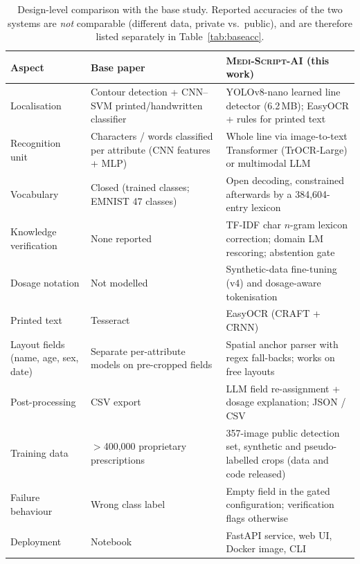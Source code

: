 \documentclass[journal]{IEEEtran}
\newcommand{\sys}{\textsc{Medi-Script-AI}}
\begin{document}
\begin{table}[t]
\centering
\caption{Design-level comparison with the base study. Reported accuracies of the two systems are \emph{not} comparable (different data, private vs.\ public), and are therefore listed separately in Table~\ref{tab:baseacc}.}
\label{tab:compare}
\renewcommand{\arraystretch}{1.12}
\begin{tabular}{p{2.4cm}p{5.1cm}p{6.6cm}}
\toprule
\textbf{Aspect} & \textbf{Base paper~\cite{biswas2026novel}} & \textbf{\sys{} (this work)} \\
\midrule
Localisation & Contour detection + CNN--SVM printed/handwritten classifier & YOLOv8-nano learned line detector (6.2\,MB); EasyOCR + rules for printed text \\
Recognition unit & Characters / words classified per attribute (CNN features + MLP) & Whole line via image-to-text Transformer (TrOCR-Large) or multimodal LLM \\
Vocabulary & Closed (trained classes; EMNIST 47 classes) & Open decoding, constrained afterwards by a 384{,}604-entry lexicon \\
Knowledge verification & None reported & TF-IDF char $n$-gram lexicon correction; domain LM rescoring; abstention gate \\
Dosage notation & Not modelled & Synthetic-data fine-tuning (v4) and dosage-aware tokenisation \\
Printed text & Tesseract~\cite{smith2007tesseract} & EasyOCR (CRAFT + CRNN)~\cite{baek2019craft,jaidedai2020easyocr} \\
Layout fields (name, age, sex, date) & Separate per-attribute models on pre-cropped fields & Spatial anchor parser with regex fall-backs; works on free layouts \\
Post-processing & CSV export & LLM field re-assignment + dosage explanation; JSON / CSV \\
Training data & $>$400{,}000 proprietary prescriptions & 357-image public detection set, synthetic and pseudo-labelled crops (data and code released) \\
Failure behaviour & Wrong class label & Empty field in the gated configuration; verification flags otherwise \\
Deployment & Notebook & FastAPI service, web UI, Docker image, CLI \\
\bottomrule
\end{tabular}
\end{table}

\end{document}
